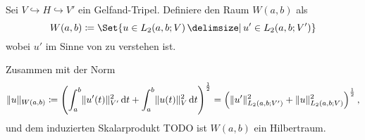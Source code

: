 \begin{Definition}
    Sei $V \hookrightarrow H \hookrightarrow V'$ ein Gelfand-Tripel.
    Definiere den Raum $W(a, b)$ als
    \begin{equation}
        W(a, b) \deq \Set{u \in L_{2}(a, b; V) \given u' \in L_{2}(a, b; V')}
    \end{equation}
    wobei $u'$ im Sinne von  zu verstehen ist.
\end{Definition}

\begin{Lemma}
    Zusammen mit der Norm
    \begin{equation}
        \lVert u\rVert_{W(a, b)} \coloneqq \left( \int_{a}^{b} \lVert u'(t)\rVert_{V'}^{2} \mathop{}\!\mathrm{d} t + \int_{a}^{b} \lVert u(t)\rVert_{V}^{2} \mathop{}\!\mathrm{d} t \right)^{\frac 12}
        = \left( \lVert u'\rVert_{L_{2}(a, b; V')}^{2} + \lVert u\rVert_{L_{2}(a, b; V)}^{2} \right)^{\frac 12},
    \end{equation}
    und dem induzierten Skalarprodukt TODO ist $W(a, b)$ ein Hilbertraum.
\end{Lemma}



